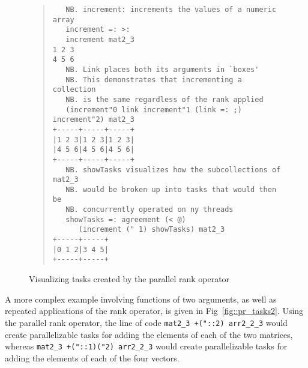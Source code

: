 \pagebreak

\begin{figure}[h]
\begin{quote}
\begin{singlespacing}
\begin{small}
\begin{verbatim}
   NB. increment: increments the values of a numeric array
   increment =: >:
   increment mat2_3
1 2 3
4 5 6
   NB. Link places both its arguments in `boxes'
   NB. This demonstrates that incrementing a collection
   NB. is the same regardless of the rank applied
   (increment"0 link increment"1 (link =: ;) increment"2) mat2_3
+-----+-----+-----+
|1 2 3|1 2 3|1 2 3|
|4 5 6|4 5 6|4 5 6|
+-----+-----+-----+
   NB. showTasks visualizes how the subcollections of mat2_3
   NB. would be broken up into tasks that would then be 
   NB. concurrently operated on ny threads
   showTasks =: agreement (< @)
      (increment (" 1) showTasks) mat2_3
+-----+-----+
|0 1 2|3 4 5|
+-----+-----+
\end{verbatim}
\end{small}
\end{singlespacing}
\end{quote}
\caption{Visualizing tasks created by the parallel rank operator}
\label{fig::pr_tasks}
\end{figure}

A more complex example involving functions of two arguments, 
as well as repeated applications of the rank operator, is given in Fig~\ref{fig::pr_tasks2}.
Using the parallel rank operator, the line of code
\texttt{mat2\_3 +("::2) arr2\_2\_3} would create parallelizable tasks for adding the elements of each of the two matrices, whereas 
\texttt{mat2\_3 +("::1)("2) arr2\_2\_3} would create parallelizable tasks for adding the elements of each of the four vectors.

